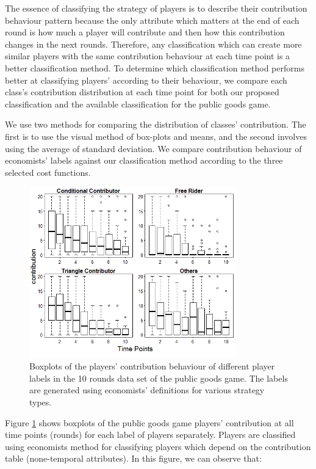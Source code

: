 The essence of classifying the strategy of players is to describe their contribution behaviour pattern \cite{Fischbacher2001} because the only attribute which matters at the end of each round is how much a player will contribute and then how this contribution changes in the next rounds. Therefore, any classification which can create more similar players with the same contribution behaviour at each time point is a better classification method. To determine which classification method performs better at classifying players' according to their behaviour, we compare each class's contribution distribution at each time point for both our proposed classification and the available classification for the public goods game. 

We use two methods for comparing the distribution of classes' contribution. The first is to use the visual method of box-plots and means, and the second involves using the average of standard deviation. We compare contribution behaviour of economists' labels against our classification method according to the three selected cost functions.



\begin{figure}[!h]
    \centering
    \includegraphics[width=0.8\textwidth]{images/chapter5/economists_PGG10_Boxplot.png}
    \caption{Boxplots of the players' contribution behaviour of different player labels in the 10 rounds data set of the public goods game. The labels are generated using economists' definitions for various strategy types.}
    \label{fig:economists_PGG10_Boxplot}
\end{figure}

Figure \ref{fig:economists_PGG10_Boxplot} shows boxplots of the public goods game players' contribution at all time points (rounds) for each label of players separately. Players are classified using economists method for classifying players which depend on the contribution table (none-temporal attributes). In this figure, we can observe that:


